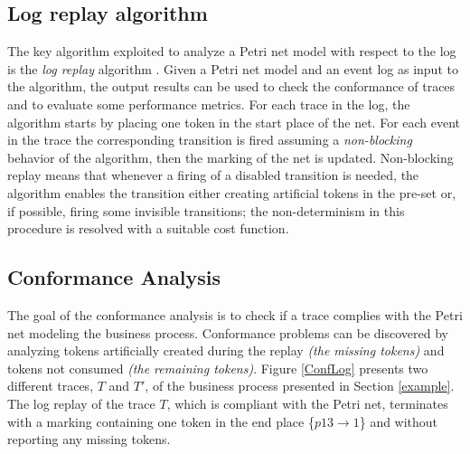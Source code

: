 \documentclass{llncs}
\begin{document}
\subsection{Log replay algorithm}\label{logreplayAlg}
The key algorithm exploited to analyze a Petri net model with respect to the log is the {\itshape log replay} algorithm \cite{13}\cite{3}\cite{4}. Given a Petri net model and an event log as input to the algorithm, the output results can be used to check the conformance of traces and to evaluate some performance metrics. For each trace in the log, the algorithm starts by placing one token in the start place of the net. For each event in the trace the corresponding transition is fired assuming a {\itshape non-blocking} behavior of the algorithm, then the marking of the net is updated. Non-blocking replay means that whenever a firing of a disabled transition is needed, the algorithm enables the transition either creating artificial tokens in the pre-set or, if possible, firing some invisible transitions; the non-determinism in this procedure is resolved with a suitable cost function. %


\subsection{Conformance Analysis}\label{ConformanceAnalysis}
The goal of the conformance analysis is to check if a trace complies with the Petri net modeling the business process. Conformance problems can be discovered by analyzing tokens artificially created during the replay {\itshape (the missing tokens)} and tokens not consumed {\itshape (the remaining tokens)}. Figure \ref{ConfLog}  presents two different traces, $T$ and $T'$, of the business process presented in Section \ref{example}. The log replay of the trace $T$, which is compliant with the Petri net, terminates with a marking containing one token in the end place \{${p13 \rightarrow 1}$\} and without reporting any missing tokens.

\end{document}
